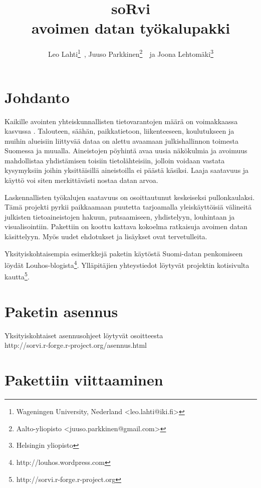 \documentclass[a4paper,finnish]{article}
\title{soRvi\\avoimen datan ty{\"o}kalupakki}
\author{Leo Lahti\footnote{Wageningen University, Nederland <leo.lahti@iki.fi>}\ , Juuso Parkkinen\footnote{Aalto-yliopisto <juuso.parkkinen@gmail.com>}\ \ ja Joona Lehtom{\"a}ki\footnote{Helsingin yliopisto}}
\begin{document}
\maketitle

\section{Johdanto}

Kaikille avointen yhteiskunnallisten tietovarantojen määrä on
voimakkaassa kasvussa \cite{Poikola10}. Talouteen, säähän,
paikkatietoon, liikenteeseen, koulutukseen ja muihin alueisiin
liittyvää dataa on alettu avaamaan julkishallinnon toimesta Suomessa
ja muualla. Aineistojen pöyhintä avaa uusia näkökulmia ja avoimuus
mahdollistaa yhdistämisen toisiin tietolähteisiin, jolloin voidaan
vastata kysymyksiin joihin yksittäisillä aineistoilla ei päästä
käsiksi. Laaja saatavuus ja käyttö voi siten merkittävästi nostaa
datan arvoa.

Laskennallisten työkalujen saatavuus on osoittautunut keskeiseksi
pullonkaulaksi. Tämä projekti pyrkii paikkaamaan puutetta tarjoamalla
yleiskäyttöisiä välineitä julkisten tietoaineistojen hakuun,
putsaamiseen, yhdistelyyn, louhintaan ja visualisointiin. Pakettiin on
koottu kattava kokoelma ratkaisuja avoimen datan käsittelyyn. Myös uudet
ehdotukset ja lisäykset ovat tervetulleita.

Yksityiskohtaisempia esimerkkejä paketin käytöstä Suomi-datan
penkomiseen löydät
Louhos-blogista\footnote{http://louhos.wordpress.com}. Ylläpitäjien
yhteystiedot löytyvät projektin kotisivulta
kautta\footnote{http://sorvi.r-forge.r-project.org}.


\section{Paketin asennus}

Yksityiskohtaiset asennusohjeet löytyvät osoitteesta\\
http://sorvi.r-forge.r-project.org/asennus.html


\section{Pakettiin viittaaminen}
\end{document}
